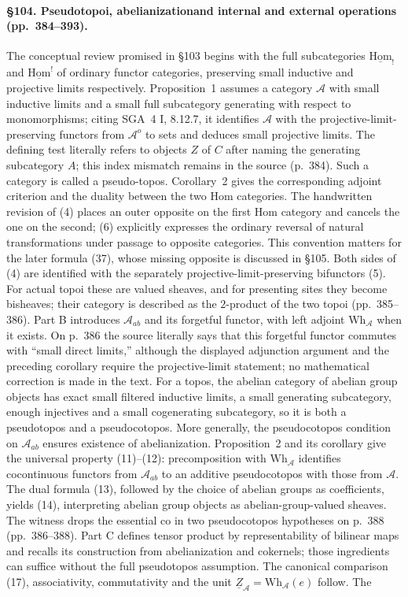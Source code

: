 \paragraph{\S104. Pseudotopoi, abelianization\newline and internal and external operations (pp.\ 384--393).}
The conceptual review promised in \S103 begins with the full subcategories $\underline{\mathrm{Hom}}_!$ and $\underline{\mathrm{Hom}}^!$ of ordinary functor categories, preserving small inductive and projective limits respectively. Proposition~1 assumes a category $\mathcal A$ with small inductive limits and a small full subcategory generating with respect to monomorphisms; citing SGA~4 I, 8.12.7, it identifies $\mathcal A$ with the projective-limit-preserving functors from $\mathcal A^o$ to sets and deduces small projective limits. The defining test literally refers to objects $Z$ of $C$ after naming the generating subcategory $A$; this index mismatch remains in the source (p.\ 384). Such a category is called a pseudo-topos. Corollary~2 gives the corresponding adjoint criterion and the duality between the two Hom categories. The handwritten revision of (4) places an outer opposite on the first Hom category and cancels the one on the second; (6) explicitly expresses the ordinary reversal of natural transformations under passage to opposite categories. This convention matters for the later formula (37), whose missing opposite is discussed in \S105. Both sides of (4) are identified with the separately projective-limit-preserving bifunctors (5). For actual topoi these are valued sheaves, and for presenting sites they become bisheaves; their category is described as the $2$-product of the two topoi (pp.\ 385--386). Part B introduces $\mathcal A_{ab}$ and its forgetful functor, with left adjoint $\mathrm{Wh}_{\mathcal A}$ when it exists. On p.\ 386 the source literally says that this forgetful functor commutes with ``small direct limits,'' although the displayed adjunction argument and the preceding corollary require the projective-limit statement; no mathematical correction is made in the text. For a topos, the abelian category of abelian group objects has exact small filtered inductive limits, a small generating subcategory, enough injectives and a small cogenerating subcategory, so it is both a pseudotopos and a pseudocotopos. More generally, the pseudocotopos condition on $\mathcal A_{ab}$ ensures existence of abelianization. Proposition~2 and its corollary give the universal property (11)--(12): precomposition with $\mathrm{Wh}_{\mathcal A}$ identifies cocontinuous functors from $\mathcal A_{ab}$ to an additive pseudocotopos with those from $\mathcal A$. The dual formula (13), followed by the choice of abelian groups as coefficients, yields (14), interpreting abelian group objects as abelian-group-valued sheaves. The witness drops the essential co in two pseudocotopos hypotheses on p.\ 388 (pp.\ 386--388). Part C defines tensor product by representability of bilinear maps and recalls its construction from abelianization and cokernels; those ingredients can suffice without the full pseudotopos assumption. The canonical comparison (17), associativity, commutativity and the unit $\underline Z_{\mathcal A}=\mathrm{Wh}_{\mathcal A}(e)$ follow. The 